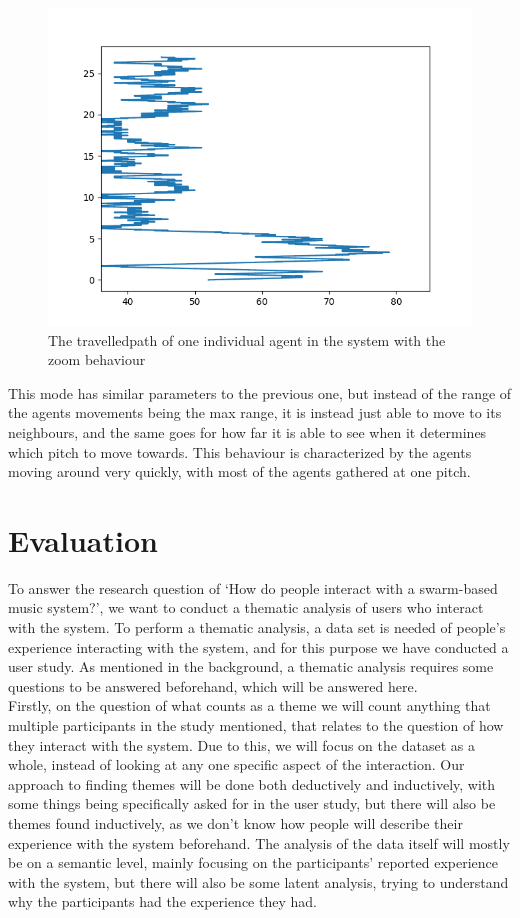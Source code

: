 \documentclass[a4paper,english]{report}
\begin{document}
	\begin{figure}
		\centering
		\includegraphics[width=1\linewidth]{zoomOneAgent}
		\caption{The travelledpath of one individual agent in the system with the zoom behaviour}
		\label{fig:zoomOne}
	\end{figure}
	This mode has similar parameters to the previous one, but instead of the range of the agents movements being the max range, it is instead just able to move to its neighbours, and the same goes for how far it is able to see when it determines which pitch to move towards. This behaviour is characterized by the agents moving around very quickly, with most of the agents gathered at one pitch.
	
	\chapter{Evaluation}
	To answer the research question of `How do people interact with a swarm-based music system?', we want to conduct a thematic analysis of users who interact with the system. To perform a thematic analysis, a data set is needed of people's experience interacting with the system, and for this purpose we have conducted a user study. As mentioned in the background, a thematic analysis requires some questions to be answered beforehand, which will be answered here. \\
	Firstly, on the question of what counts as a theme we will count anything that multiple participants in the study mentioned, that relates to the question of how they interact with the system. Due to this, we will focus on the dataset as a whole, instead of looking at any one specific aspect of the interaction. Our approach to finding themes will be done both deductively and inductively, with some things being specifically asked for in the user study, but there will also be themes found inductively, as we don't know how people will describe their experience with the system beforehand. The analysis of the data itself will mostly be on a semantic level, mainly focusing on the participants' reported experience with the system, but there will also be some latent analysis, trying to understand why the participants had the experience they had.
\end{document}
